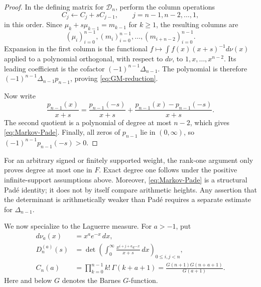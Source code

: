 \begin{proof}
In the defining matrix for \(\mathcal D_n\), perform the column operations
\[
 C_j\longleftarrow C_j+sC_{j-1},
 \qquad j=n-1,n-2,\ldots,1,
\]
in this order.  Since
\(\mu_k+s\mu_{k-1}=m_{k-1}\) for \(k\geq1\), the resulting columns are
\[
  (\mu_i)_{i=0}^{n-1},
  (m_i)_{i=0}^{n-1},
  \ldots,
  (m_{i+n-2})_{i=0}^{n-1}.
\]
Expansion in the first column is the functional
\(f\mapsto\int f(x)(x+s)^{-1}d\nu(x)\) applied to a polynomial orthogonal,
with respect to \(d\nu\), to \(1,x,\ldots,x^{n-2}\).  Its leading coefficient
is the cofactor \((-1)^{n-1}\Delta_{n-1}\).  The polynomial is therefore
\((-1)^{n-1}\Delta_{n-1}p_{n-1}\), proving
\eqref{eq:GM-reduction}.

Now write
\[
 \frac{p_{n-1}(x)}{x+s}
 =\frac{p_{n-1}(-s)}{x+s}
  +\frac{p_{n-1}(x)-p_{n-1}(-s)}{x+s}.
\]
The second quotient is a polynomial of degree at most \(n-2\), which gives
\eqref{eq:Markov-Pade}.  Finally, all zeros of \(p_{n-1}\) lie in
\((0,\infty)\), so \((-1)^{n-1}p_{n-1}(-s)>0\).
\end{proof}

\begin{remark}
For an arbitrary signed or finitely supported weight, the rank-one argument
only proves degree at most one in \(F\).  Exact degree one follows under the
positive infinite-support assumptions above.  Moreover,
\eqref{eq:Markov-Pade} is a structural Pad\'e identity; it does not by itself
compare arithmetic heights.  Any assertion that the determinant is
arithmetically weaker than Pad\'e requires a separate estimate for
\(\Delta_{n-1}\).
\end{remark}

We now specialize to the Laguerre measure.  For \(a>-1\), put
\begin{align*}
 d\nu_a(x)&=x^ae^{-x}\,dx,\\
 D_n^{(a)}(s)&=
 \det\left(\int_0^\infty
 \frac{x^{i+j+a}e^{-x}}{x+s}\,dx\right)_{0\leq i,j<n},\\
 C_n(a)&=\prod_{k=0}^{n-1}k!\,\Gamma(k+a+1)
 =\frac{G(n+1)G(n+a+1)}{G(a+1)}.
\end{align*}
Here and below \(G\) denotes the Barnes \(G\)-function.

